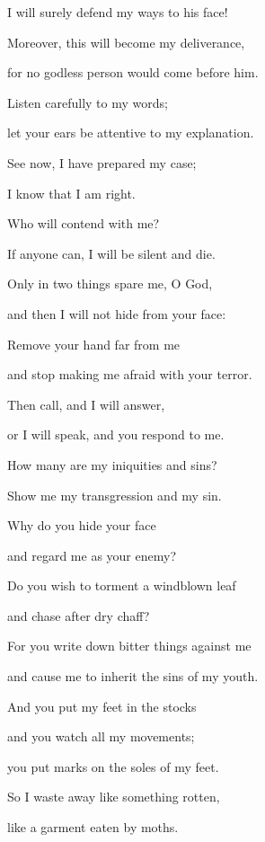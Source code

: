 {\par }{\Q I will surely
defend
my ways
to
his face!
\par }{\Q {}Moreover,
this
will become my deliverance,
\par }{\Q for
no
godless
person would come
before him.
\par }{\Q {}Listen
carefully to my words;
\par }{\Q let your ears
be attentive to my explanation.
\par }{\Q {}See
now,
I have prepared
my case;
\par }{\Q I know
that
I am
right.
\par }{\Q {}Who
will contend
with me?
\par }{\Q If
anyone can, I will be silent
and die.
\par }{\Q {}Only
in two
things spare
me, O God,
\par }{\Q and then
I will not
hide
from your face:
\par }{\Q {}Remove your hand
far
from me
\par }{\Q and stop
making me afraid
with your terror.
\par }{\Q {}Then call,
and I
will answer,
\par }{\Q or
I will speak,
and you respond to me.
\par }{\Q {}How
many are my iniquities
and sins?
\par }{\Q Show
me my transgression
and my sin.
\par }{\Q {}Why
do you hide
your face
\par }{\Q and regard
me as your enemy?
\par }{\Q {}Do you wish to torment
a windblown
leaf
\par }{\Q and chase
after dry
chaff?
\par }{\Q {}For
you write
down bitter things
against me
\par }{\Q and cause me to inherit
the sins
of my youth.
\par }{\Q {}And you put
my feet
in the stocks
\par }{\Q and you watch
all
my movements;
\par }{\Q you put marks
on
the soles
of my feet.
\par }{\Q {}So I waste away
like something rotten,
\par }{\Q like a garment
eaten
by moths.


\par }
